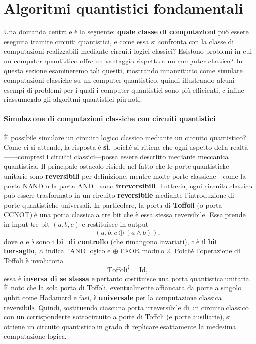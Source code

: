 \documentclass[a4paper,12pt]{report}
\theoremstyle{plain}
\begin{document}
\chapter{Algoritmi quantistici fondamentali}
Una domanda centrale è la seguente: \textbf{quale classe di computazioni} può essere eseguita tramite circuiti quantistici, e come essa si confronta con la classe di computazioni realizzabili mediante circuiti logici classici? Esistono problemi in cui un computer quantistico offre un vantaggio rispetto a un computer classico? In questa sezione esamineremo tali quesiti, mostrando innanzitutto come simulare computazioni classiche su un computer quantistico, quindi illustrando alcuni esempi di problemi per i quali i computer quantistici sono più efficienti, e infine riassumendo gli algoritmi quantistici più noti.
\subsubsection{Simulazione di computazioni classiche con circuiti quantistici}
È possibile simulare un circuito logico classico mediante un circuito quantistico? Come ci si attende, la risposta è \textbf{sì}, poiché si ritiene che ogni aspetto della realtà—\newline—compresi i circuiti classici—possa essere descritto mediante meccanica quantistica. Il principale ostacolo risiede nel fatto che le porte quantistiche unitarie sono \textbf{reversibili} per definizione, mentre molte porte classiche—come la porta NAND o la porta AND—sono \textbf{irreversibili}.
Tuttavia, ogni circuito classico può essere trasformato in un circuito \textbf{reversibile} mediante l'introduzione di porte quantistiche universali. In particolare, la porta di \textbf{Toffoli} (o porta CCNOT) è una porta classica a tre bit che è essa stessa reversibile. Essa prende in input tre bit $(a,b,c)$ e restituisce in output
\[
(a,b,c \oplus (a \land b)),
\]
dove $a$ e $b$ sono i \textbf{bit di controllo} (che rimangono invariati), $c$ è il \textbf{bit bersaglio}, $\land$ indica l'AND logico e $\oplus$ l'XOR modulo 2. Poiché l'operazione di Toffoli è involutoria,
\[
\mathrm{Toffoli}^2 = \mathrm{Id},
\]
essa è \textbf{inversa di se stessa} e pertanto costituisce una porta quantistica unitaria.
È noto che la sola porta di Toffoli, eventualmente affiancata da porte a singolo qubit come Hadamard e fasi, è \textbf{universale} per la computazione classica reversibile. Quindi, sostituendo ciascuna porta irreversibile di un circuito classico con un corrispondente sottocircuito a porte di Toffoli (e porte ausiliarie), si ottiene un circuito quantistico in grado di replicare esattamente la medesima computazione logica.
\end{document}
